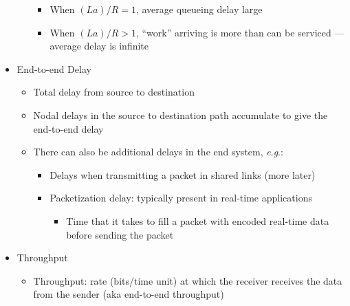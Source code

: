 \begin{itemize}
\begin{itemize}
\begin{itemize}
          \item When $(La)/R=1$, average queueing delay large

          \item When $(La)/R>1$, ``work'' arriving is more than can be serviced — average delay is infinite

        \end{itemize}

    \end{itemize}

  \item End-to-end Delay

    \begin{itemize}

      \item Total delay from source to destination

      \item Nodal delays in the source to destination path accumulate to give the end-to-end delay

      \item There can also be additional delays in the end system, \textit{e}.\textit{g}.:

        \begin{itemize}

          \item Delays when transmitting a packet in shared links (more later)

          \item Packetization delay: typically present in real-time applications

            \begin{itemize}

              \item Time that it takes to fill a packet with encoded real-time data before sending the packet

            \end{itemize}

        \end{itemize}

    \end{itemize}

  \item Throughput

    \begin{itemize}

      \item Throughput: rate (bits/time unit) at which the receiver receives the data from the sender (aka end-to-end throughput)


\end{itemize}
\end{itemize}
